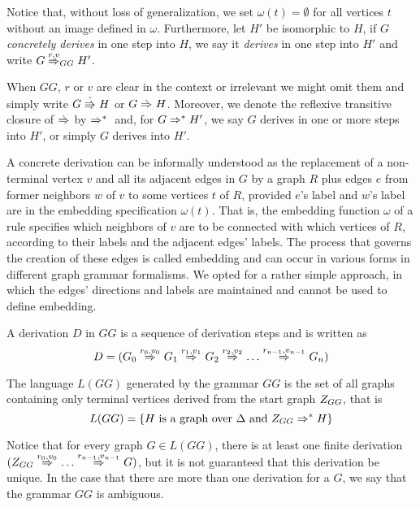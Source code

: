 \documentclass[runningheads]{llncs}
\begin{document}
Notice that, without loss of generalization, we set $\omega(t) = \emptyset$ for all vertices $t$ without an image defined in $\omega$. Furthermore, let $H'$ be isomorphic to $H$, if $G$ \textit{concretely derives} in one step into $H$, we say it \textit{derives} in one step into $H'$ and write $G \deriv{r}{v}{GG} H'$. 
	
When $GG$, $r$ or $v$ are clear in the context or irrelevant we might omit them and simply write $G \cderiv{}{}{} H$ or $G \deriv{}{}{} H$. Moreover, we denote the reflexive transitive closure of $\deriv{}{}{}$ by $\Rightarrow^*_{}{}{}$ and, for $G \Rightarrow^*_{}{}{} H'$, we say $G$ derives in one or more steps into $H'$, or simply $G$ derives into $H'$.

A concrete derivation can be informally understood as the replacement of a non-terminal vertex $v$ and all its adjacent edges in $G$ by a graph $R$ plus edges $e$ from former neighbors $w$ of $v$ to some vertices $t$ of $R$, provided $e$'s label and $w$'s label are in the embedding specification $\omega(t)$. That is, the embedding function $\omega$ of a rule specifies which neighbors of $v$ are to be connected with which vertices of $R$, according to their labels and the adjacent edges' labels. The process that governs the creation of these edges is called embedding and can occur in various forms in different graph grammar formalisms. We opted for a rather simple approach, in which the edges' directions and labels are maintained and cannot be used to define embedding.

\begin{definition}
	A derivation $D$ in $GG$ is a sequence of derivation steps and is written as
	\begin{equation*}
		D = (G_0 \deriv{r_0}{v_0}{} G_1 \deriv{r_1}{v_1}{} G_2 \deriv{r_2}{v_2}{} \dots \deriv{r_{n-1}}{v_{n-1}}{} G_n)
	\end{equation*}
\end{definition}

\begin{definition}
	\label{def:language}
	The language $L(GG)$ generated by the grammar $GG$ is the set of all graphs containing only terminal vertices derived from the start graph $Z_{GG}$, that is
	\begin{equation*}
		L(GG) = \{H \text{ is a graph over } \Delta \text{ and } Z_{GG} \Rightarrow^*_{}{}{} H\}
	\end{equation*}
\end{definition}

Notice that for every graph $G \in L(GG)$, there is at least one finite derivation $(\startG{GG} \deriv{r_0}{v_0}{} \dots \deriv{r_{n-1}}{v_{n-1}}{} G)$, but it is not guaranteed that this derivation be unique. In the case that there are more than one derivation for a $G$, we say that the grammar $GG$ is ambiguous. 
\end{document}
